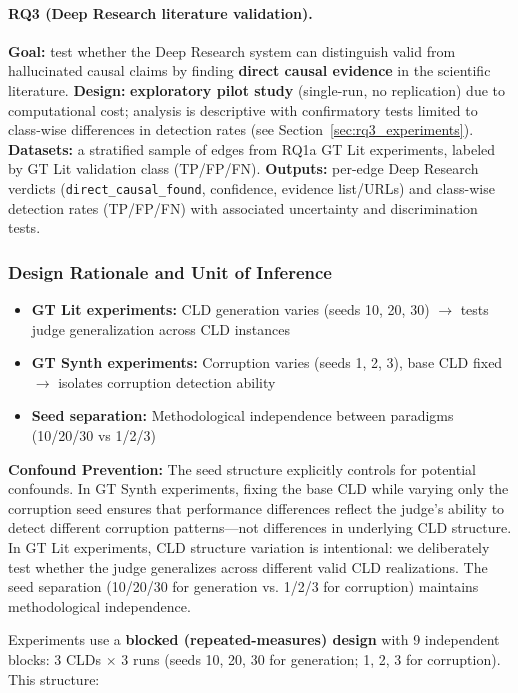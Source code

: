 \paragraph{RQ3 (Deep Research literature validation).}
\textbf{Goal:} test whether the Deep Research system can distinguish valid from hallucinated causal claims by finding \textbf{direct causal evidence} in the scientific literature.
\textbf{Design:} \textbf{exploratory pilot study} (single-run, no replication) due to computational cost; analysis is descriptive with confirmatory tests limited to class-wise differences in detection rates (see Section~\ref{sec:rq3_experiments}).
\textbf{Datasets:} a stratified sample of edges from RQ1a GT Lit experiments, labeled by GT Lit validation class (TP/FP/FN).
\textbf{Outputs:} per-edge Deep Research verdicts (\texttt{direct\_causal\_found}, confidence, evidence list/URLs) and class-wise detection rates (TP/FP/FN) with associated uncertainty and discrimination tests.

\subsubsection{Design Rationale and Unit of Inference}
\label{sec:block_design}
\begin{itemize}[noitemsep]
    \item \textbf{GT Lit experiments:} CLD generation varies (seeds 10, 20, 30) $\rightarrow$ tests judge generalization across CLD instances
    \item \textbf{GT Synth experiments:} Corruption varies (seeds 1, 2, 3), base CLD fixed $\rightarrow$ isolates corruption detection ability
    \item \textbf{Seed separation:} Methodological independence between paradigms (10/20/30 vs 1/2/3)
\end{itemize}

\textbf{Confound Prevention:} The seed structure explicitly controls for potential confounds. In GT Synth experiments, fixing the base CLD while varying only the corruption seed ensures that performance differences reflect the judge's ability to detect different corruption patterns---not differences in underlying CLD structure. In GT Lit experiments, CLD structure variation is intentional: we deliberately test whether the judge generalizes across different valid CLD realizations. The seed separation (10/20/30 for generation vs. 1/2/3 for corruption) maintains methodological independence.

Experiments use a \textbf{blocked (repeated-measures) design} with 9 independent blocks: 3 CLDs $\times$ 3 runs (seeds 10, 20, 30 for generation; 1, 2, 3 for corruption). This structure:


